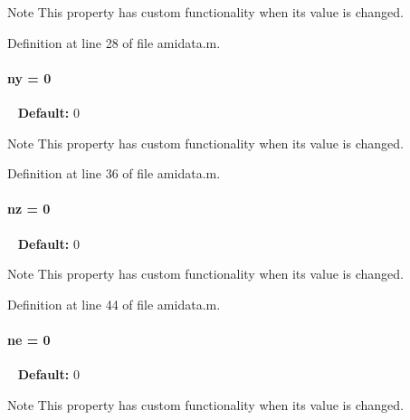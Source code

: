 \begin{DoxyNote}{Note}
This property has custom functionality when its value is changed. 
\end{DoxyNote}


Definition at line 28 of file amidata.\+m.

\hypertarget{classamidata_a289ca425eb368f1d582b6be2be0d3dfc}{}
\paragraph[{ny}]{\setlength{\rightskip}{0pt plus 5cm}ny = 0}\label{classamidata_a289ca425eb368f1d582b6be2be0d3dfc}
~\newline
{\bfseries Default\+:} 0

\begin{DoxyNote}{Note}
This property has custom functionality when its value is changed. 
\end{DoxyNote}


Definition at line 36 of file amidata.\+m.

\hypertarget{classamidata_a79f11413e5bfe18a0e71e17574399ad5}{}
\paragraph[{nz}]{\setlength{\rightskip}{0pt plus 5cm}nz = 0}\label{classamidata_a79f11413e5bfe18a0e71e17574399ad5}
~\newline
{\bfseries Default\+:} 0

\begin{DoxyNote}{Note}
This property has custom functionality when its value is changed. 
\end{DoxyNote}


Definition at line 44 of file amidata.\+m.

\hypertarget{classamidata_aaca25d624cf863f786f67137c62aa11d}{}
\paragraph[{ne}]{\setlength{\rightskip}{0pt plus 5cm}ne = 0}\label{classamidata_aaca25d624cf863f786f67137c62aa11d}
~\newline
{\bfseries Default\+:} 0

\begin{DoxyNote}{Note}
This property has custom functionality when its value is changed. 
\end{DoxyNote}


